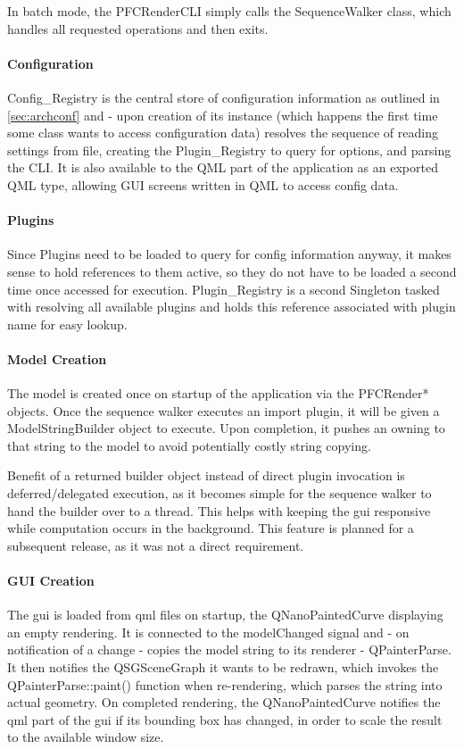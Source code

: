 In batch mode, the PFCRenderCLI simply calls the SequenceWalker class, which handles all requested operations and then exits.

\paragraph{Configuration}
Config\_Registry is the central store of configuration information as outlined in \ref{sec:archconf} and - upon creation of its instance (which happens the first time some class wants to access configuration data) resolves the sequence of reading settings from file, creating the Plugin\_Registry to query for options, and parsing the CLI. It is also available to the QML part of the application as an exported QML type, allowing GUI screens written in QML to access config data.

\paragraph{Plugins} Since Plugins need to be loaded to query for config information anyway, it makes sense to hold references to them active, so they do not have to be loaded a second time once accessed for execution. Plugin\_Registry is a second Singleton tasked with resolving all available plugins and holds this reference associated with plugin name for easy lookup.

\paragraph{Model Creation} The model is created once on startup of the application via the PFCRender* objects. Once the sequence walker executes an import plugin, it will be given a ModelStringBuilder object to execute. Upon completion, it pushes an owning  to that string to the model to avoid potentially costly string copying.

Benefit of a returned builder object instead of direct plugin invocation is deferred/delegated execution, as it becomes simple for the sequence walker to hand the builder over to a thread. This helps with keeping the \gls{gui} responsive while computation occurs in the background. This feature is planned for a subsequent release, as it was not a direct requirement.

\paragraph{GUI Creation} The \gls{gui} is loaded from \gls{qml} files on startup, the QNanoPaintedCurve displaying an empty rendering. It is connected to the modelChanged signal and - on notification of a change - copies the model string to its renderer - QPainterParse. It then notifies the QSGSceneGraph it wants to be redrawn, which invokes the QPainterParse::paint() function when re-rendering, which parses the string into actual geometry. On completed rendering, the QNanoPaintedCurve notifies the \gls{qml} part of the \gls{gui} if its \gls{bounding box} has changed, in order to scale the result to the available window size.

